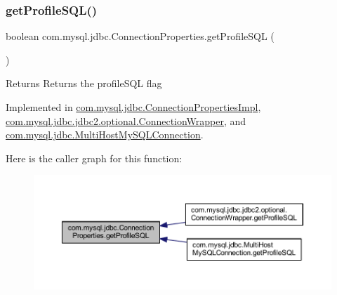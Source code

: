 \subsubsection{\texorpdfstring{get\+Profile\+S\+Q\+L()}{getProfileSQL()}}
{\footnotesize\ttfamily boolean com.\+mysql.\+jdbc.\+Connection\+Properties.\+get\+Profile\+S\+QL (\begin{DoxyParamCaption}{ }\end{DoxyParamCaption})}

\begin{DoxyReturn}{Returns}
Returns the profile\+S\+QL flag 
\end{DoxyReturn}


Implemented in \mbox{\hyperlink{classcom_1_1mysql_1_1jdbc_1_1_connection_properties_impl_a8996c90f639a9d9223f7ffe0124e1129}{com.\+mysql.\+jdbc.\+Connection\+Properties\+Impl}}, \mbox{\hyperlink{classcom_1_1mysql_1_1jdbc_1_1jdbc2_1_1optional_1_1_connection_wrapper_a2e1b1b2b6690b7b02510266fc541f86f}{com.\+mysql.\+jdbc.\+jdbc2.\+optional.\+Connection\+Wrapper}}, and \mbox{\hyperlink{classcom_1_1mysql_1_1jdbc_1_1_multi_host_my_s_q_l_connection_a579cb97c35050ac81eea5afe7338122f}{com.\+mysql.\+jdbc.\+Multi\+Host\+My\+S\+Q\+L\+Connection}}.

Here is the caller graph for this function\+:\nopagebreak
\begin{figure}[H]
\begin{center}
\leavevmode
\includegraphics[width=350pt]{interfacecom_1_1mysql_1_1jdbc_1_1_connection_properties_af0e1c9e18770d1c2478851ab1dcd1d70_icgraph}
\end{center}
\end{figure}
\mbox{\label{interfacecom_1_1mysql_1_1jdbc_1_1_connection_properties_a0d177b2a7b7de4fc521d3362343375de}} 
